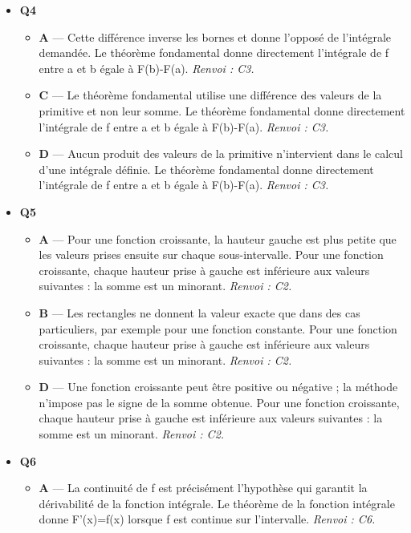 \begin{itemize}
\begin{itemize}
    \item \textbf{D} — La positivité de f rend au contraire son intégrale positive ou nulle. Pour f continue positive, l'intégrale entre a et b représente l'aire sous la courbe sur cet intervalle. \emph{Renvoi : C1.}
  \end{itemize}
  \item \textbf{Q4}
  \begin{itemize}
    \item \textbf{A} — Cette différence inverse les bornes et donne l'opposé de l'intégrale demandée. Le théorème fondamental donne directement l'intégrale de f entre a et b égale à F(b)-F(a). \emph{Renvoi : C3.}
    \item \textbf{C} — Le théorème fondamental utilise une différence des valeurs de la primitive et non leur somme. Le théorème fondamental donne directement l'intégrale de f entre a et b égale à F(b)-F(a). \emph{Renvoi : C3.}
    \item \textbf{D} — Aucun produit des valeurs de la primitive n'intervient dans le calcul d'une intégrale définie. Le théorème fondamental donne directement l'intégrale de f entre a et b égale à F(b)-F(a). \emph{Renvoi : C3.}
  \end{itemize}
  \item \textbf{Q5}
  \begin{itemize}
    \item \textbf{A} — Pour une fonction croissante, la hauteur gauche est plus petite que les valeurs prises ensuite sur chaque sous-intervalle. Pour une fonction croissante, chaque hauteur prise à gauche est inférieure aux valeurs suivantes : la somme est un minorant. \emph{Renvoi : C2.}
    \item \textbf{B} — Les rectangles ne donnent la valeur exacte que dans des cas particuliers, par exemple pour une fonction constante. Pour une fonction croissante, chaque hauteur prise à gauche est inférieure aux valeurs suivantes : la somme est un minorant. \emph{Renvoi : C2.}
    \item \textbf{D} — Une fonction croissante peut être positive ou négative ; la méthode n'impose pas le signe de la somme obtenue. Pour une fonction croissante, chaque hauteur prise à gauche est inférieure aux valeurs suivantes : la somme est un minorant. \emph{Renvoi : C2.}
  \end{itemize}
  \item \textbf{Q6}
  \begin{itemize}
    \item \textbf{A} — La continuité de f est précisément l'hypothèse qui garantit la dérivabilité de la fonction intégrale. Le théorème de la fonction intégrale donne F'(x)=f(x) lorsque f est continue sur l'intervalle. \emph{Renvoi : C6.}

\end{itemize}
\end{itemize}
